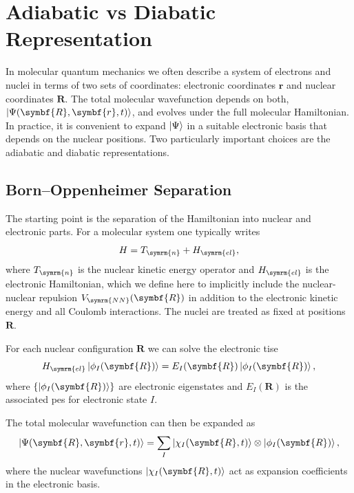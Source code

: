 \section{Adiabatic vs Diabatic Representation}\label{sec:adiabatic_vs_diabatic_representation}
In molecular quantum mechanics we often describe a system of electrons and nuclei in terms of two sets of coordinates: electronic coordinates $\symbf{r}$ and nuclear coordinates $\symbf{R}$. The total molecular wavefunction depends on both, $\ket{\Psi(\symbf{R},\symbf{r},t)}$, and evolves under the full molecular Hamiltonian. In practice, it is convenient to expand $\ket{\Psi}$ in a suitable electronic basis that depends on the nuclear positions. Two particularly important choices are the adiabatic and diabatic representations.
\subsection{Born--Oppenheimer Separation}\label{sec:born_oppenheimer_separation}
The starting point is the separation of the Hamiltonian into nuclear and electronic parts. For a molecular system one typically writes
\begin{equation}\label{eq:boa_hamiltonian}
H=T_{\symrm{n}}+H_{\symrm{el}},
\end{equation}
where $T_{\symrm{n}}$ is the nuclear kinetic energy operator and $H_{\symrm{el}}$ is the electronic Hamiltonian, which we define here to implicitly include the nuclear-nuclear repulsion $V_{\symrm{NN}}(\symbf{R})$ in addition to the electronic kinetic energy and all Coulomb interactions. The nuclei are treated as fixed at positions $\symbf{R}$.

For each nuclear configuration $\symbf{R}$ we can solve the electronic \gls{tise}
\begin{equation}
H_{\symrm{el}}\ket{\phi_I(\symbf{R})}=E_I(\symbf{R})\ket{\phi_I(\symbf{R})},
\end{equation}
where $\{\ket{\phi_I(\symbf{R})}\}$ are electronic eigenstates and $E_I(\symbf{R})$ is the associated \gls{pes} for electronic state $I$.

The total molecular wavefunction can then be expanded as
\begin{equation}\label{eq:boa_expansion}
\ket{\Psi(\symbf{R},\symbf{r},t)}=\sum_I\ket{\chi_I(\symbf{R},t)}\otimes\ket{\phi_I(\symbf{R})},
\end{equation}
where the nuclear wavefunctions $\ket{\chi_I(\symbf{R},t)}$ act as expansion coefficients in the electronic basis.


